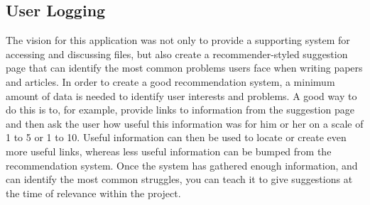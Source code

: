 \subsection{User Logging}

The vision for this application was not only to provide a supporting system for accessing and discussing files, but also create a recommender-styled suggestion page that can identify the most common problems users face when writing papers and articles.
In order to create a good recommendation system, a minimum amount of data is needed to identify user interests and problems.
A good way to do this is to, for example, provide links to information from the suggestion page and then ask the user
how useful this information was for him or her on a scale of 1 to 5 or 1 to 10. Useful information can then be used to locate
or create even more useful links, whereas less useful information can be bumped from the recommendation system. Once the system
has gathered enough information, and can identify the most common struggles, you can teach it to give suggestions at the time
of relevance within the project. 